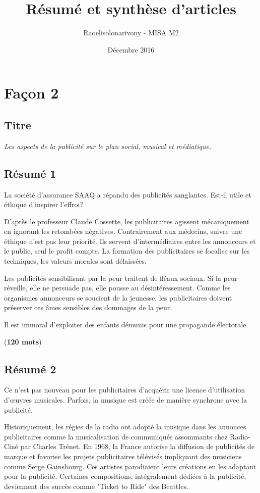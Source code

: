 \documentclass[11pt]{article}
\title{Résumé et synthèse d'articles}
\author{Raoelisolonarivony - MISA M2}
\date{Décembre 2016}
\begin{document}
\section{Façon 2}

\subsection{Titre}

\emph{\large Les aspects de la publicité sur le plan social, musical et médiatique.}

\subsection{Résumé 1}

La société d'assurance SAAQ a répandu des publicités sanglantes. Est-il utile et éthique d'inspirer l'effroi? 

D'après le professeur Claude Cossette, les publicitaires agissent mécaniquement en ignorant les retombées négatives. Contrairement aux médecins, suivre une éthique n'est pas leur priorité. Ils servent d'intermédiaires entre les annonceurs et le public, seul le profit compte. La formation des publicitaires se focalise sur les techniques, les valeurs morales sont délaissées. 

Les publicités sensibilisant par la peur traitent de fléaux sociaux. Si la peur réveille, elle ne persuade pas, elle pousse au désintéressement. Comme les organismes annonceurs se soucient de la jeunesse, les publicitaires doivent préserver ces âmes sensibles des dommages de la peur. 

Il est immoral d'exploiter des enfants démunis pour une propagande électorale. 

(\textbf{120 mots})

\subsection{Résumé 2}

Ce n'est pas nouveau pour les publicitaires d'acquérir une licence d'utilisation d'\oe uvres musicales. Parfois, la musique est créée de manière synchrone avec la publicité.

Historiquement, les régies de la radio ont adopté la musique dans les annonces publicitaires comme la musicalisation de communiqués assommants chez Radio-Ciné par Charles Trénet.
En 1968, la France autorise la diffusion de publicités de marque et favorise les projets publicitaires télévisés impliquant des musiciens comme Serge Gainsbourg.
Ces artistes parodiaient leurs créations en les adaptant pour la publicité. Certaines compositions, intégralement dédiées à la publicité, deviennent des succès comme "Ticket to Ride" des Beattles.
 
\end{document}
